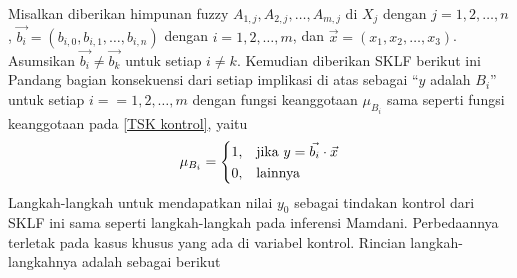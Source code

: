 \noindent Misalkan diberikan himpunan fuzzy $A_{1,j},A_{2,j}, \ldots, A_{m,j}$  di $X_j$ dengan $j=1,2,\ldots,n$, $\Vec{b_i} = (b_{i,0},b_{i,1},\ldots, b_{i,n})$ dengan $i=1,2,\ldots,m$, dan $\Vec{x} = (x_1,x_2,\ldots,x_3)$. Asumsikan $\Vec{b_i} \neq \Vec{b_k}$ untuk setiap $i\neq k$. Kemudian diberikan SKLF berikut ini
\flctsk
Pandang bagian konsekuensi dari setiap implikasi di atas sebagai ``$y$ adalah $B_i$'' untuk setiap $i==1,2,\ldots,m$ dengan fungsi keanggotaan $\mu_{B_i}$ sama seperti fungsi keanggotaan pada \ref{TSK kontrol}, yaitu
\[\mu_{B_i} = 
\begin{dcases}
1, & \text{jika } y=\Vec{b_i}\cdot\Vec{x}\\
0, & \text{lainnya}
\end{dcases}
\]
Langkah-langkah untuk mendapatkan nilai $y_0$ sebagai tindakan kontrol dari SKLF ini sama seperti langkah-langkah pada inferensi Mamdani. Perbedaannya terletak pada kasus khusus yang ada di variabel kontrol. Rincian langkah-langkahnya adalah sebagai berikut
